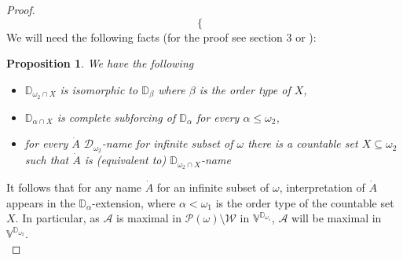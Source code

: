 \documentclass[a4paper]{amsart}
\newtheorem{proposition}[theorem]{Proposition}
\newcommand{\WANDER}{\mathcal{W}}
\begin{document}
\begin{proof}
\begin{equation*}
\begin{cases}
        \end{cases}
    \end{equation*}
    We will need the following facts (for the proof see \cite{Yoryoka} section 3 or \cite{BrendleAntichains}):
    \begin{proposition}
    We have the following
    \begin{itemize}
        \item[--] $\mathbb{D}_{\omega_{2}\cap X}$ is isomorphic to $\mathbb{D}_{\beta}$ where $\beta$ is the order type of $X$,
        \item[--] $\mathbb{D}_{\alpha\cap X}$ is complete subforcing of $\mathbb{D}_{\alpha}$ for every $\alpha\leq\omega_{2}$,
        \item[--] for every $\dot{A}$ $\mathcal{D}_{\omega_{2}}$-name for infinite subset of $\omega$ there is a countable set $X\subseteq\omega_{2}$ such that $\dot{A}$ is (equivalent to) $\mathbb{D}_{\omega_{2}\cap X}$-name
    \end{itemize}
    \end{proposition}
    It follows that for any name $\dot{A}$ for an infinite subset of $\omega$, interpretation of $\dot{A}$ appears in the $\mathbb{D}_{\alpha}$-extension, where $\alpha<\omega_{1}$ is the order type of the countable set $X$. In particular, as $\mathcal{A}$ is maximal in $\mathcal{P}(\omega)\setminus\WANDER$ in $\mathbb{V}^{\mathbb{D}_{\omega_{1}}}$, $\mathcal{A}$ will be maximal in $\mathbb{V}^{\mathbb{D}_{\omega_{2}}}$.\\



\end{proof}
\end{document}
